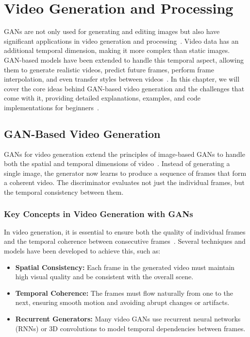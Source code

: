 \chapter{Video Generation and Processing}
GANs are not only used for generating and editing images but also have significant applications in video generation and processing~\cite{adadi2021survey}. Video data has an additional temporal dimension, making it more complex than static images. GAN-based models have been extended to handle this temporal aspect, allowing them to generate realistic videos, predict future frames, perform frame interpolation, and even transfer styles between videos~\cite{xu2024videogigagan}. In this chapter, we will cover the core ideas behind GAN-based video generation and the challenges that come with it, providing detailed explanations, examples, and code implementations for beginners~\cite{tulyakov2017mocogan}.

\section{GAN-Based Video Generation}
GANs for video generation extend the principles of image-based GANs to handle both the spatial and temporal dimensions of video~\cite{chen2017coherent}. Instead of generating a single image, the generator now learns to produce a sequence of frames that form a coherent video. The discriminator evaluates not just the individual frames, but the temporal consistency between them.

\subsection{Key Concepts in Video Generation with GANs}
In video generation, it is essential to ensure both the quality of individual frames and the temporal coherence between consecutive frames~\cite{li2024survey}. Several techniques and models have been developed to achieve this, such as:
\begin{itemize}
    \item \textbf{Spatial Consistency:} Each frame in the generated video must maintain high visual quality and be consistent with the overall scene.
    \item \textbf{Temporal Coherence:} The frames must flow naturally from one to the next, ensuring smooth motion and avoiding abrupt changes or artifacts.
    \item \textbf{Recurrent Generators:} Many video GANs use recurrent neural networks (RNNs) or 3D convolutions to model temporal dependencies between frames.
\end{itemize}

